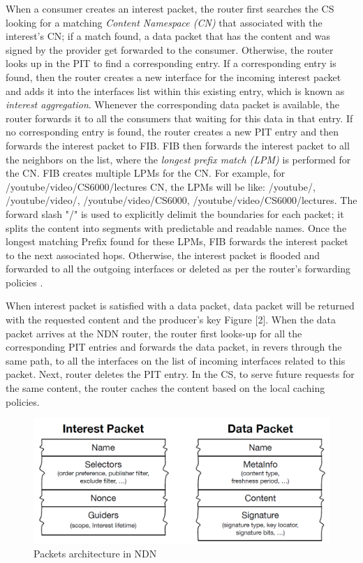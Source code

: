 \documentclass[conference]{IEEEtran}
\begin{document}
When a consumer creates an interest packet, the router first searches the CS looking for a matching \textit{Content Namespace (CN)} that associated with the interest's CN; if a match found, a data packet that has the content and was signed by the provider get forwarded to the consumer. Otherwise, the router looks up in the PIT to find a corresponding entry. If a corresponding entry is found, then the router creates a new interface for the incoming interest packet and adds it into the interfaces list within this existing entry, which is known as \textit{interest aggregation}. Whenever the corresponding data packet is available, the router forwards it to all the consumers that waiting for this data in that entry. If no corresponding entry is found, the router creates a new PIT entry and then forwards the interest packet to FIB. FIB then forwards the interest packet to all the neighbors on the list, where the \textit{longest prefix match (LPM)} is performed for the CN. FIB creates multiple LPMs for the CN. For example, for /youtube/video/CS6000/lectures CN, the LPMs will be like: /youtube/, /youtube/video/, /youtube/video/CS6000, /youtube/video/CS6000/lectures. The forward slash "/" is used to explicitly delimit the boundaries for each packet; it splits the content into segments with predictable and readable names. Once the longest matching Prefix found for these LPMs, FIB forwards the interest packet to the next associated hops. Otherwise, the interest packet is flooded and forwarded to all the outgoing interfaces or deleted as per the router's forwarding policies \cite{8352953}.


When interest packet is satisfied with a data packet, data packet will be returned with the requested content and the producer's key Figure [2]. When the data packet arrives at the NDN router, the router first looks-up for all the corresponding PIT entries and forwards the data packet, in revers through the same path, to all the interfaces on the list of incoming interfaces related to this packet. Next, router deletes the PIT entry. In the CS, to serve future requests for the same content, the router caches the content based on the local caching policies. 

\begin{figure} [ht]
    \centering
    \includegraphics[width=\columnwidth]{NDN_Packets.png}
    \caption{\small Packets architecture in NDN}
    \label{fig:my_label1}
\end{figure}
\end{document}
